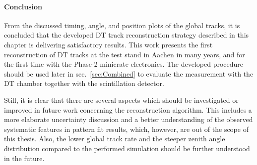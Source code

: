 \FloatBarrier
\paragraph{Conclusion}
From the discussed timing, angle, and position plots of the global tracks, it is concluded that the developed \ac{DT} track reconstruction strategy described in this chapter is delivering satisfactory results. This work presents the first reconstruction of \ac{DT} tracks at the test stand in Aachen in many years, and for the first time with the Phase-2 minicrate electronics. The developed procedure should be used later in sec.\ \ref{sec:Combined} to evaluate the measurement with the \ac{DT} chamber together with the scintillation detector.
\par Still, it is clear that there are several aspects which should be investigated or improved in future work concerning the reconstruction algorithm. This includes a more elaborate uncertainty discussion and a better understanding of the observed systematic features in pattern fit results, which, however, are out of the scope of this thesis. Also, the lower global track rate and the steeper zenith angle distribution compared to the performed simulation should be further understood in the future.

